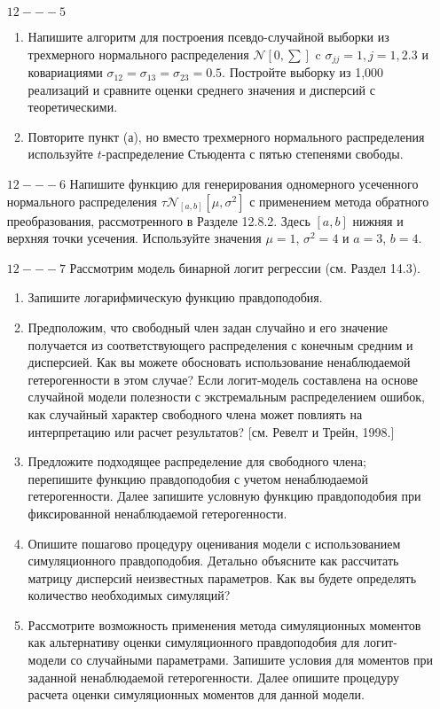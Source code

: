 \begin{enumerate}
\item [$12 --- 5$] 
\begin{enumerate}
\item Напишите алгоритм для построения псевдо-случайной выборки из трехмерного  нормального распределения $\mathcal{N}[0,\sum]$ c $\sigma_{jj}=1, j=1,2.3$ и ковариациями $\sigma_{12}=\sigma_{13}=\sigma_{23}=0.5$. Постройте выборку из 1,000 реализаций и сравните  оценки среднего значения и дисперсий с теоретическими.
\item Повторите пункт (а), но вместо трехмерного нормального распределения используйте $t$-распределение Стьюдента с пятью степенями свободы.
\end{enumerate}

\item [$12 --- 6$] Напишите функцию для генерирования одномерного усеченного нормального распределения $\tau\mathcal{N}_{[a,b]}[\mu,\sigma^2]$ с применением метода обратного преобразования, рассмотренного в Разделе 12.8.2. Здесь $[a,b]$ нижняя и верхняя точки усечения. Используйте значения $\mu=1$, $\sigma^2=4$ и $a=3$, $b=4$.

\item [$12 --- 7$] Рассмотрим модель бинарной логит регрессии (см. Раздел 14.3).
\begin{enumerate}
\item Запишите логарифмическую функцию правдоподобия.
\item Предположим, что свободный член задан случайно и его значение получается из соответствующего распределения с конечным средним и дисперсией. Как вы можете обосновать  использование ненаблюдаемой гетерогенности в этом случае? Если логит-модель составлена на основе случайной  модели полезности с экстремальным распределением ошибок, как случайный характер свободного члена может повлиять на интерпретацию или расчет результатов? [см. Ревелт и Трейн, 1998.]
\item Предложите подходящее распределение для свободного члена; перепишите функцию правдоподобия с учетом ненаблюдаемой гетерогенности. Далее запишите условную функцию правдоподобия при фиксированной ненаблюдаемой гетерогенности.
\item Опишите пошагово процедуру оценивания модели с использованием симуляционного  правдоподобия. Детально объясните как рассчитать матрицу дисперсий неизвестных параметров. Как вы будете определять количество необходимых симуляций?
\item Рассмотрите возможность применения метода симуляционных моментов как альтернативу оценки симуляционного правдоподобия для логит-модели со случайными параметрами. Запишите условия для моментов при заданной ненаблюдаемой гетерогенности. Далее опишите процедуру расчета оценки симуляционных моментов для данной модели.
\end{enumerate}



\end{enumerate}

